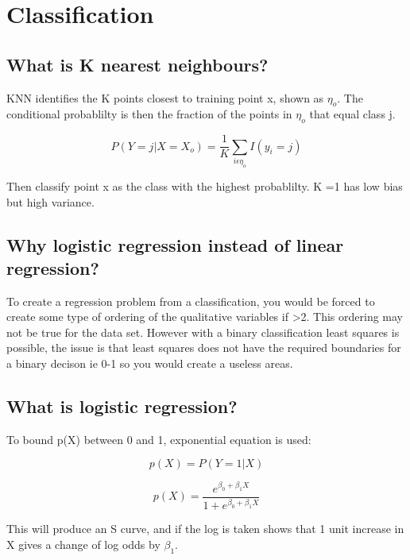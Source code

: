 \documentclass[11pt]{scrartcl} %
\begin{document}
\section{Classification}

\subsection{What is K nearest neighbours?}

KNN identifies the K points closest to training point x, shown as \(\eta_o\). The conditional probablilty is then
the fraction of the points in \(\eta_o\) that equal class j.

\begin{equation}
	P(Y=j|X=X_o) = \frac{1}{K}\sum_{i\epsilon \eta_o}{I(y_i=j)}
\end{equation}

Then classify point x as the class with the highest probablilty. K =1 has low bias but high variance.

\subsection{Why logistic regression instead of linear regression?}

To create a regression problem from a classification, you would be forced to create some type of ordering of the qualitative
variables if >2. This ordering may not be true for the data set. However with a binary classification least squares is possible, the
issue is that least squares does not have the required boundaries for a binary decison ie 0-1 so you would create a useless areas.

\subsection{What is logistic regression?}

To bound p(X) between 0 and 1, exponential equation is used:

\begin{equation}
	p(X) = P(Y=1|X)
\end{equation}

\begin{equation}
	p(X) = \frac{e^{\beta_0 + \beta_1X}}{1+e^{\beta_0 + \beta_1X}}
\end{equation}

This will produce an S curve, and if the log is taken shows that 1 unit increase in X gives a change of log odds by 
\( \beta_1\).
\end{document}

